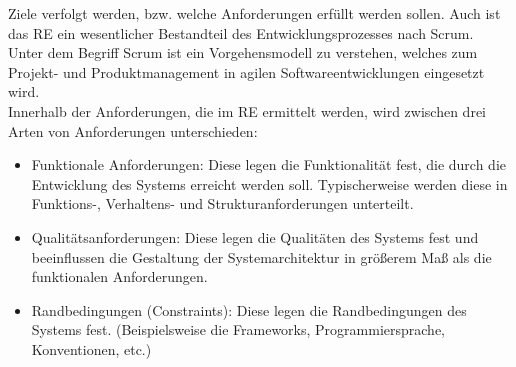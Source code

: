     Ziele verfolgt werden, bzw. welche Anforderungen erfüllt werden sollen. Auch ist das \acl{RE} ein wesentlicher 
    Bestandteil des Entwicklungsprozesses nach Scrum. Unter dem Begriff Scrum ist ein Vorgehensmodell zu verstehen, 
    welches zum Projekt- und Produktmanagement in agilen Softwareentwicklungen eingesetzt wird. 
    \\
    \linebreak
    Innerhalb der Anforderungen, die im \acl{RE} ermittelt werden, wird zwischen drei Arten von Anforderungen unterschieden: 
    \begin{itemize}
        \item Funktionale Anforderungen: Diese legen die Funktionalität fest, die durch die Entwicklung des Systems 
            erreicht werden soll. Typischerweise werden diese in Funktions-, Verhaltens- und Strukturanforderungen unterteilt.
        \item Qualitätsanforderungen: Diese legen die Qualitäten des Systems fest und beeinflussen die Gestaltung der 
            Systemarchitektur in größerem Maß als die funktionalen Anforderungen.
        \item Randbedingungen (Constraints): Diese legen die Randbedingungen des Systems fest. (Beispielsweise die Frameworks, Programmiersprache, Konventionen, etc.)
    \end{itemize}
